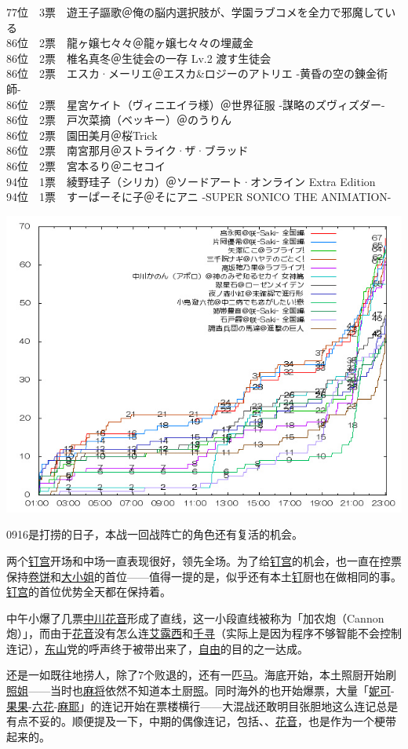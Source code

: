 { 77位　3票　遊王子謳歌＠俺の脳内選択肢が、学園ラブコメを全力で邪魔している\\
 86位　2票　龍ヶ嬢七々々＠龍ヶ嬢七々々の埋蔵金\\
 86位　2票　椎名真冬＠生徒会の一存 Lv.2 渡す生徒会\\
 86位　2票　エスカ·メーリエ＠エスカ\&ロジーのアトリエ -黄昏の空の錬金術師-\\
 86位　2票　星宮ケイト（ヴィニエイラ様）＠世界征服 -謀略のズヴィズダー-\\
 86位　2票　戸次菜摘（ベッキー）＠のうりん\\
 86位　2票　園田美月＠桜Trick\\
 86位　2票　南宮那月＠ストライク·ザ·ブラッド\\
 86位　2票　宮本るり＠ニセコイ\\
 94位　1票　綾野珪子（シリカ）＠ソードアート·オンライン Extra Edition\\
 94位　1票　すーぱーそに子＠そにアニ -SUPER SONICO THE ANIMATION-
}

\includegraphics[width=.8\textwidth]{images/graph0916.jpg}

0916是打捞的日子，本战一回战阵亡的角色还有复活的机会。

两个\uline{钉宫}开场和中场一直表现很好，领先全场。为了给\uline{钉宫}的机会，也一直在控票保持\uline{卷饼}和\uline{大小姐}的首位——值得一提的是，似乎还有本土\uline{钉}厨也在做相同的事。\uline{钉宫}的首位优势全天都在保持着。

中午小爆了几票\uline{中川花音}形成了直线，这一小段直线被称为「加农炮（Cannon炮）」，而由于\uline{花音}没有怎么连\uline{艾露西}和\uline{千寻}（实际上是因为程序不够智能不会控制连记），\uline{东山}党的呼声终于被带出来了，\uline{自由}的目的之一达成。

还是一如既往地捞人，除了7个败退的，还有一匹\uline{马}。海底开始，本土照厨开始刷\uline{照姐}——当时也\uline{麻将}依然不知道本土厨\uline{照}。同时海外的也开始爆票，大量「\uline{妮可}-\uline{果果}-\uline{六花}-\uline{麻耶}」的连记开始在票楼横行——大混战还敢明目张胆地这么连记总是有点不妥的。顺便提及一下，中期的偶像连记，包括、、\uline{花音}，也是作为一个梗带起来的。

